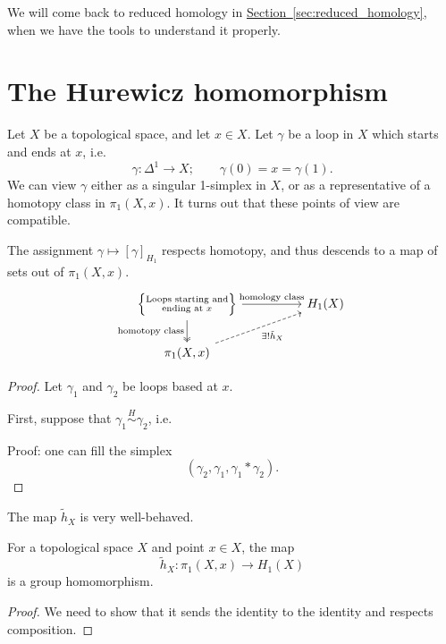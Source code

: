 \documentclass[main.tex]{subfiles}
\begin{document}
We will come back to reduced homology in \hyperref[sec:reduced_homology]{Section~\ref*{sec:reduced_homology}}, when we have the tools to understand it properly.

\section{The Hurewicz homomorphism}
\label{sec:the_hurewicz_homomorphism}

Let $X$ be a topological space, and let $x \in X$. Let $\gamma$ be a loop in $X$ which starts and ends at $x$, i.e.\
\begin{equation*}
  \gamma\colon \Delta^{1} \to X;\qquad \gamma(0) = x = \gamma(1).
\end{equation*}
We can view $\gamma$ either as a singular 1-simplex in $X$, or as a representative of a homotopy class in $\pi_{1}(X, x)$. It turns out that these points of view are compatible.

\begin{lemma}
  \label{lemma:hurewicz_respects_homology_class}
  The assignment $\gamma \mapsto [\gamma]_{H_{1}}$ respects homotopy, and thus descends to a map of sets out of $\pi_{1}(X, x)$.
  \begin{equation*}
    \begin{tikzcd}[column sep=huge]
      \left\{\substack{\text{Loops starting and}\\\text{ending at }x}\right\}
      \arrow[r, "\text{homology class}"]
      \arrow[d, two heads, swap, "\text{homotopy class}"]
      & H_{1}(X)
      \\
      \pi_{1}(X, x)
      \arrow[ur, dashed, swap, "\exists!\tilde{h}_{X}"]
    \end{tikzcd}
  \end{equation*}
\end{lemma}
\begin{proof}
  Let $\gamma_{1}$ and $\gamma_{2}$ be loops based at $x$.

  First, suppose that $\gamma_{1} \overset{H}{\sim} \gamma_{2}$, i.e.\

  Proof: one can fill the simplex
  \begin{equation*}
    (\gamma_{2}, \gamma_{1}, \gamma_{1} * \gamma_{2}).
  \end{equation*}
\end{proof}

The map $\tilde{h}_{X}$ is very well-behaved.

\begin{lemma}
  \label{lemma:hurewicz_is_homomorphism}
  For a topological space $X$ and point $x \in X$, the map
  \begin{equation*}
    \tilde{h}_{X}\colon \pi_{1}(X, x) \to H_{1}(X)
  \end{equation*}
  is a group homomorphism.
\end{lemma}
\begin{proof}
  We need to show that it sends the identity to the identity and respects composition.
\end{proof}
\end{document}
